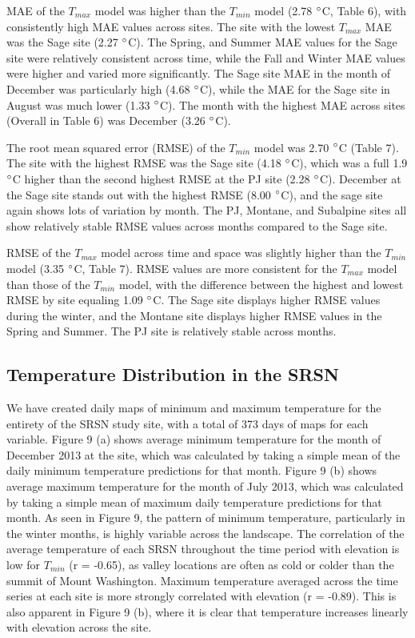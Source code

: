 \documentclass{ametsoc}
\begin{document}
MAE of the $T_{max}$ model was higher than the $T_{min}$ model (2.78 $\degree$C,
Table 6), with consistently high MAE values across sites. The site with the
lowest $T_{max}$ MAE was the Sage site (2.27 $\degree$C). The Spring, and Summer
MAE values for the Sage site were relatively consistent across time, while the
Fall and Winter MAE values were higher and varied more significantly. The Sage
site MAE in the month of December was particularly high (4.68 $\degree$C), while
the MAE for the Sage site in August was much lower (1.33 $\degree$C). The month
with the highest MAE across sites (Overall in Table 6) was December (3.26
$\degree$C).

The root mean squared error (RMSE) of the $T_{min}$ model was 2.70 $\degree$C
(Table 7). The site with the highest RMSE was the Sage site (4.18 $\degree$C),
which was a full 1.9 $\degree$C higher than the second highest RMSE at the PJ
site (2.28 $\degree$C). December at the Sage site stands out with the highest
RMSE (8.00 $\degree$C), and the sage site again shows lots of variation by
month. The PJ, Montane, and Subalpine sites all show relatively stable RMSE
values across months compared to the Sage site.

RMSE of the $T_{max}$ model across time and space was slightly higher than the
$T_{min}$ model (3.35 $\degree$C, Table 7). RMSE values are more consistent for
the $T_{max}$ model than those of the $T_{min}$ model, with the difference
between the highest and lowest RMSE by site equaling 1.09 $\degree$C. The Sage
site displays higher RMSE values during the winter, and the Montane site
displays higher RMSE values in the Spring and Summer. The PJ site is relatively
stable across months.

\subsection{Temperature Distribution in the SRSN}
We have created daily maps of minimum and maximum temperature for the entirety
of the SRSN study site, with a total of 373 days of maps for each variable.
Figure 9 (a) shows average minimum temperature for the month of December 2013 at
the site, which was calculated by taking a simple mean of the daily minimum
temperature predictions for that month. Figure 9 (b) shows average maximum
temperature for the month of July 2013, which was calculated by taking a simple
mean of maximum daily temperature predictions for that month. As seen in Figure
9, the pattern of minimum temperature, particularly in the winter months,  is
highly variable across the landscape. The correlation of the average temperature
of each SRSN throughout the time period with elevation is low for $T_{min}$ (r =
-0.65), as valley locations are often as cold or colder than the summit of Mount
Washington. Maximum temperature averaged across the time series at each site is
more strongly correlated with elevation (r = -0.89). This is also apparent in
Figure 9 (b), where it is clear that temperature increases linearly with
elevation across the site.
\end{document}
